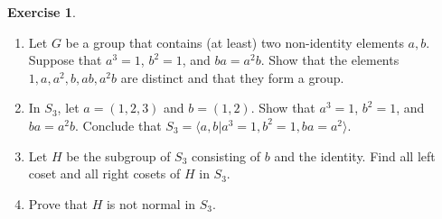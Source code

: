 \documentclass[11pt,oneside]{article}
\numberwithin{equation}{section}
\theoremstyle{definition}
\newtheorem{exercise}{Exercise}
\begin{document}
\begin{exercise}
  \begin{enumerate}
  \item
    Let $G$ be a group that contains (at least) two non-identity
    elements $a, b$. Suppose that $a^3 = 1$, $b^2 = 1$, and $ba =
    a^2b$. Show that the elements $1, a, a^2, b, ab, a^2b$ are distinct and that
    they form a group.
  \item
    In $S_3$, let $a = (1, 2,3)$ and $b = (1,2)$. Show that $a^3 = 1$,
    $b^2 = 1$, and $ba = a^2 b$. Conclude that $S_3 = \langle a,b | a^3 = 1, b^2 = 1, ba=a^2 \rangle$.
  \item
    Let $H$ be the subgroup of $S_3$ consisting of $b$ and the
    identity.  Find all left coset and all right cosets of $H$
    in $S_3$.
  \item
    Prove that $H$ is not normal in $S_3$. 
  \end{enumerate}
\end{exercise}
\end{document}
